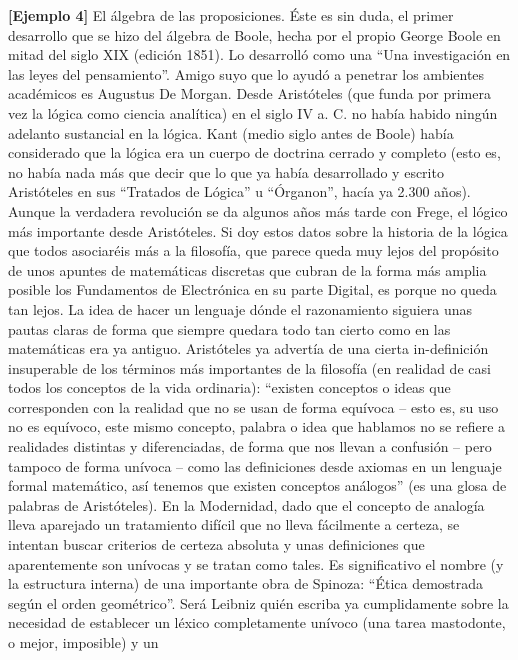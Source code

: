 \begin{enumerate}
  \textbf{{[}Ejemplo 4{]}} El álgebra de las proposiciones. Éste es sin
  duda, el primer desarrollo que se hizo del álgebra de Boole, hecha por
  el propio George Boole en mitad del siglo XIX (edición 1851). Lo
  desarrolló como una ``Una investigación en las leyes del
  pensamiento''. Amigo suyo que lo ayudó a penetrar los ambientes
  académi\-cos es Augustus De Morgan. Desde Aristóteles (que funda por
  primera vez la ló\-gica como ciencia analítica) en el siglo IV a. C.
  no había habido ningún adelanto sustancial en la lógica. Kant (medio
  siglo antes de Boole) había considerado que la lógica era un cuerpo de
  doctrina cerrado y completo (esto es, no había nada más que decir que
  lo que ya había desarrollado y escrito Aristóteles en sus ``Tra\-tados
  de Lógica'' u ``Órganon'', hacía ya 2.300 años). Aunque la verdadera
  revolu\-ción se da algunos años más tarde con Frege, el lógico más
  importante desde Aristóteles. Si doy estos datos sobre la historia de
  la lógica que todos asociaréis más a la filosofía, que parece queda
  muy lejos del propósito de unos apuntes de matemáticas discretas que
  cubran de la forma más amplia posible los Fundamentos de Electró\-nica
  en su parte Digital, es porque no queda tan lejos. La idea de hacer un
  len\-guaje dónde el razonamiento siguiera unas pautas claras de forma
  que siempre quedara todo tan cierto como en las matemáticas era ya
  antiguo. Aristóteles ya advertía de una cierta in-definición
  insuperable de los términos más importantes de la filosofía (en
  realidad de casi todos los conceptos de la vida ordinaria):
  ``exis\-ten conceptos o ideas que corresponden con la realidad que no
  se usan de forma equívoca -- esto es, su uso no es equívoco, este
  mismo concepto, palabra o idea que hablamos no se refiere a realidades
  distintas y diferenciadas, de forma que nos llevan a confusión -- pero
  tampoco de forma unívoca -- como las definiciones desde axiomas en un
  lenguaje formal matemático, así tenemos que existen con\-ceptos
  análogos'' (es una glosa de palabras de Aristóteles). En la
  Modernidad, dado que el concepto de analogía lleva aparejado un
  tratamiento difícil que no lleva fácilmente a certeza, se intentan
  buscar criterios de certeza absoluta y unas definiciones que
  aparentemente son unívocas y se tratan como tales. Es significativo el
  nombre (y la estructura interna) de una importante obra de Spino\-za:
  ``Ética demostrada según el orden geométrico''. Será Leibniz quién
  escriba ya cumplidamente sobre la necesidad de establecer un léxico
  completamente unívoco (una tarea mastodonte, o mejor, imposible) y un

\end{enumerate}
